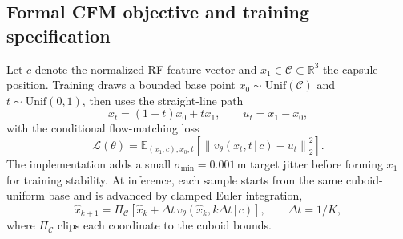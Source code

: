 \subsection{Formal CFM objective and training specification}
Let $c$ denote the normalized RF feature vector and $x_1\in\mathcal{C}\subset
\mathbb{R}^3$ the capsule position. Training draws a bounded base point
$x_0\sim\mathrm{Unif}(\mathcal{C})$ and $t\sim\mathrm{Unif}(0,1)$, then uses
the straight-line path
\begin{equation}
x_t=(1-t)x_0+t x_1,\qquad u_t=x_1-x_0,
\label{eq:cfm-path}
\end{equation}
with the conditional flow-matching loss
\begin{equation}
\mathcal{L}(\theta)=
\mathbb{E}_{(x_1,c),x_0,t}\left[
\left\|v_\theta(x_t,t\,|\,c)-u_t\right\|_2^2
\right].
\label{eq:cfm-loss}
\end{equation}
The implementation adds a small $\sigma_{\min}=0.001$\,m target jitter before
forming $x_1$ for training stability. At inference, each sample starts from the
same cuboid-uniform base and is advanced by clamped Euler integration,
\begin{equation}
\hat{x}_{k+1}=\Pi_{\mathcal{C}}\!\left[
\hat{x}_{k}+\Delta t\,v_\theta(\hat{x}_{k},k\Delta t\,|\,c)
\right],\qquad \Delta t=1/K ,
\label{eq:cfm-euler}
\end{equation}
where $\Pi_{\mathcal{C}}$ clips each coordinate to the cuboid bounds.

